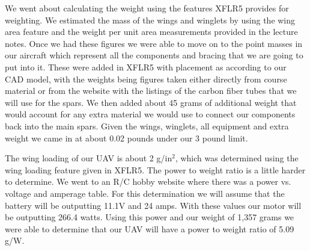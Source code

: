     We went about calculating the weight using the features XFLR5 provides for weighting. We estimated the mass of the wings and winglets by using the wing area feature and the weight per unit area measurements provided in the lecture notes. Once we had these figures we were able to move on to the point masses in our aircraft which represent all the components and bracing that we are going to put into it. These were added in XFLR5 with placement as according to our CAD model, with the weights being figures taken either directly from course material or from the website with the listings of the carbon fiber tubes that we will use for the spars. We then added about 45 grams of additional weight that would account for any extra material we would use to connect our components back into the main spars. Given the wings, winglets, all equipment and extra weight we came in at about 0.02 pounds under our 3 pound limit. 
    
    The wing loading of our UAV is about 2 g/in$^2$, which was determined using the wing loading feature given in XFLR5. The power to weight ratio is a little harder to determine. We went to an R/C hobby website where there was a power vs. voltage and amperage table. For this determination we will assume that the battery will be outputting 11.1V and 24 amps. With these values our motor will be outputting 266.4 watts. Using this power and our weight of 1,357 grams we were able to determine that our UAV will have a power to weight ratio of 5.09 g/W.



